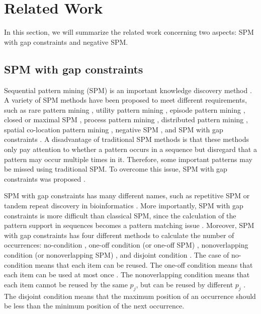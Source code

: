 \section{Related Work}
\label{section2}
In this section, we will summarize the related work concerning two aspects: SPM with gap constraints and negative SPM. 

\subsection{SPM with gap constraints}
Sequential pattern mining (SPM)  is an important knowledge discovery method \cite{pmdb2022,wu2022tmis}. A variety of SPM methods have been proposed to meet different requirements, such as rare pattern mining \cite {rarepattern,rarepattern2}, utility pattern mining \cite{hanpminer, unil-utility1, 6_Gan2021}, episode pattern mining \cite{13episodepattern, 14episoderule}, closed or maximal SPM  \cite{29_Wu2020, 30_Li2021}, process pattern mining \cite {processmining1, processmining2}, distributed pattern mining \cite {distributedmining}, spatial co-location pattern mining \cite{Wang2022colocation, Wang2023}, negative SPM \cite {dong2023, dong2018}, and SPM with gap constraints \cite{tkdd2012}. A disadvantage of traditional SPM methods is that these methods only pay attention to whether a pattern occurs in a sequence but disregard that a pattern may occur multiple times in it. Therefore, some important patterns may be missed using traditional SPM.  To overcome this issue, SPM with gap constraints was proposed \cite{33_Zhang2007}. 

SPM with gap constraints has many different names, such as repetitive SPM \cite {yongxintong} or tandem repeat discovery in bioinformatics \cite {tandemrepeat}. More importantly, SPM with gap constraints is more difficult than classical SPM, since the calculation of the pattern support in sequences becomes a pattern matching issue \cite{scis2017}. Moreover, SPM with gap constraints has four different methods to calculate the number of occurrences: no-condition  \cite{12_Min2020}, one-off condition (or one-off SPM) \cite{45_Wu2021,oneoff2}, nonoverlapping condition (or nonoverlapping SPM) \cite{14_Wu2018}, and disjoint condition \cite{disjoint2021}. The case of no-condition means that each item can be reused. The one-off condition means that each item can be used at most once \cite{28_Wu2021}. The nonoverlapping condition means that each item cannot be reused by the same $p_j$, but can be reused by different $p_j$ \cite{gengtkde2024}. The disjoint condition means that the maximum position of an occurrence should be less than the minimum position of the next occurrence. 

